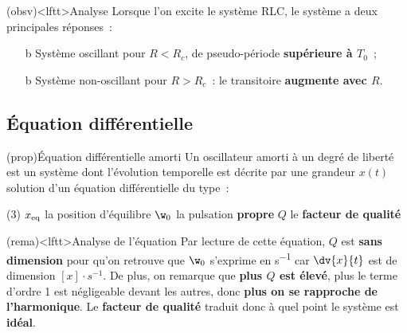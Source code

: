 \documentclass[../../main/main.tex]{subfiles}
\begin{document}
\begin{tcn}(obsv)<lftt>{Analyse}
	Lorsque l'on excite le système RLC, le système a deux principales réponses~:
	\begin{enumerate}
		\item[b]{Système oscillant} pour $R < R_{c}$, de pseudo-période
		      \textbf{supérieure à $T_0$}~;
		\item[b]{Système non-oscillant} pour $R > R_c$~: le transitoire
		      \textbf{augmente avec $R$}.
	\end{enumerate}
\end{tcn}

\subsection{Équation différentielle}

\begin{tcb}[label=prop:eqdiffoh](prop){Équation différentielle amorti}
	Un oscillateur amorti à un degré de liberté est un système dont l'évolution
	temporelle est décrite par une grandeur $x(t)$ solution d'un équation
	différentielle du type~:
	\psw{%
	\[
		\boxed{
		\dv[2]{x}{t} + \frac{\w_0}{Q} \dv{x}{t} + \w_0{}^2x =
		\w_0{}^2x_{\rm eq}
		}%
	\]
	}%
	\vspace{-15pt}
	\begin{tasks}[label=\arabic*)](3)
		\task $x_{\rm eq}$ la position d'équilibre
		\task $\w_0$ la pulsation \textbf{propre}
		\task $Q$ le \textbf{facteur de qualité}
	\end{tasks}
\end{tcb}

\begin{tcb}[label=rema:eqdiffamorti](rema)<lftt>{Analyse de l'équation}
	Par lecture de cette équation, $Q$ est \textbf{sans dimension} pour qu'on
	retrouve que $\w_0$ s'exprime en \si{s^{-1}} car $\dv{x}{t}$ est de dimension
	$[x]\cdot\si{s^{-1}}$.
	\bigbreak
	De plus, on remarque que \textbf{plus $Q$ est élevé}, plus le terme
	d'ordre 1 est négligeable devant les autres, donc \textbf{plus on se
		rapproche de l'harmonique}. Le \textbf{facteur de qualité} traduit donc à
	quel point le système est \textbf{idéal}.
\end{tcb}
\end{document}
